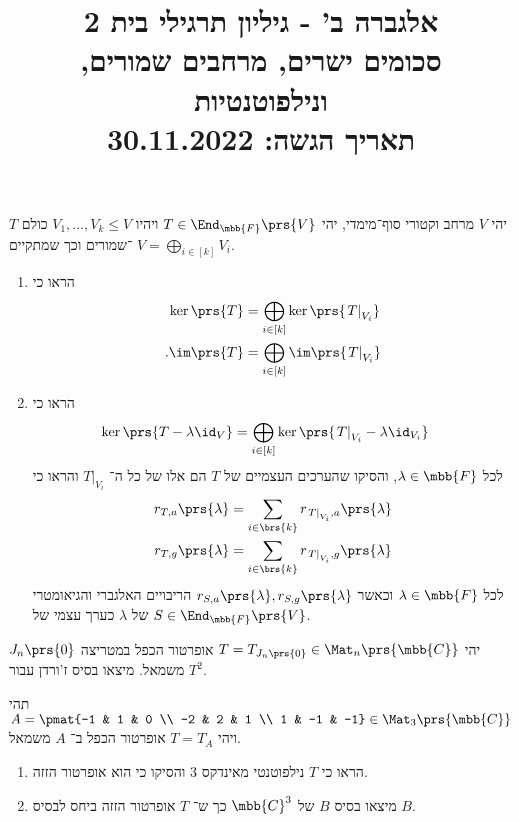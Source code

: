 \documentclass[a4paper,10pt,twoside,openany]{article}
\title{
אלגברה ב' - גיליון תרגילי בית 2 \\
סכומים ישרים, מרחבים שמורים, ונילפוטנטיות
\\
\vspace{1cm}
\large{תאריך הגשה: 30.11.2022}
}
\date{}
\begin{document}
\maketitle

\begin{exercise}
יהי
$V$
מרחב וקטורי סוף־מימדי, יהי
$T \in \End_{\mbb{F}}\prs{V}$
ויהיו
$V_1, \ldots, V_k \leq V$
כולם
$T$%
־שמורים וכך שמתקיים
$V = \bigoplus_{i \in [k]} V_i$.

\begin{enumerate}
\item 
הראו כי
\begin{align*}
\ker\prs{T} &= \bigoplus_{i \in [k]} \ker\prs{\left. T \right|_{V_i}} \\
\text{.} \im\prs{T} &= \bigoplus_{i \in [k]} \im\prs{\left. T \right|_{V_i}}
\end{align*}

\item
הראו כי
\begin{align*}
\ker\prs{T - \lambda \id_V} &= \bigoplus_{i \in [k]} \ker\prs{\left. T \right|_{V_i} - \lambda \id_{V_i}}
\end{align*}
לכל
$\lambda \in \mbb{F}$,
והסיקו שהערכים העצמיים של
$T$
הם אלו של כל ה־%
$\left. T \right|_{V_i}$
והראו כי
\begin{align*}
r_{T,a}\prs{\lambda} &= \sum_{i \in \brs{k}} r_{\left. T \right|_{V_i}, a}\prs{\lambda} \\
r_{T,g}\prs{\lambda} &= \sum_{i \in \brs{k}} r_{\left. T \right|_{V_i}, g}\prs{\lambda}
\end{align*}
לכל
$\lambda \in \mbb{F}$
וכאשר
$r_{S,a}\prs{\lambda}, r_{S,g}\prs{\lambda}$
הריבויים האלגברי והגיאומטרי של
$\lambda$
כערך עצמי של
$S \in \End_{\mbb{F}}\prs{V}$.
\end{enumerate}
\end{exercise}

\begin{exercise}
יהי
$T = T_{J_n\prs{0}} \in \Mat_n\prs{\mbb{C}}$
אופרטור הכפל במטריצה
$J_n\prs{0}$
משמאל.
מיצאו בסיס ז'ורדן עבור
$T^2$.
\end{exercise}

\begin{exercise}
תהי
$A = \pmat{-1 & 1 & 0 \\ -2 & 2 & 1 \\ 1 & -1 & -1} \in \Mat_3\prs{\mbb{C}}$
ויהי
$T = T_A$
אופרטור הכפל ב־%
$A$
משמאל.

\begin{enumerate}
\item הראו כי
$T$
נילפוטנטי מאינדקס
$3$
והסיקו כי הוא אופרטור הזזה.

\item
מיצאו בסיס
$B$
של
$\mbb{C}^3$
כך ש־%
$T$
אופרטור הזזה ביחס לבסיס
$B$.
\end{enumerate}
\end{exercise}
\end{document}
